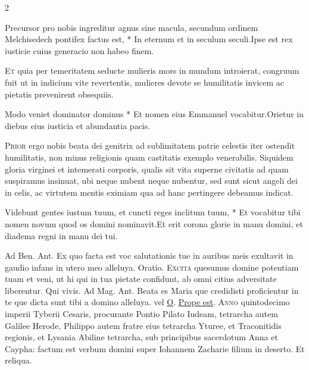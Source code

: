 \begin{multicols*}{2}
\begin{responsory}
{Precursor pro nobis ingreditur agnus sine macula, secundum ordinem Melchisedech pontifex factus est, * In eternum et in seculum seculi.}{Ipse est rex iusticie cuius generacio non habeo finem.}
\end{responsory}%
\lettrine[lines=2]{\zallmancaps \color{Blue} E}{t} quia per temeritatem seducte mulieris mors in mundum introierat, congruum fuit ut in indicium vite revertentis, mulieres devote se humilitatis invicem ac pietatis prevenirent obsequiis.
\begin{responsory}
{Modo veniet dominator dominus * Et nomen eius Emmanuel vocabitur.}{Orietur in diebus eius iusticia et abundantia pacis.}
\end{responsory}%
\lettrine[lines=2]{\zallmancaps \color{Red} P}{rior} ergo nobis beata dei genitrix ad sublimitatem patrie celestis iter ostendit humilitatis, non minus religionis quam castitatis exemplo venerabilis. Siquidem gloria virginei et intemerati corporis, qualis sit vita superne civitatis ad quam suspiramus insinuat, ubi neque nubent neque nubentur, sed sunt sicut angeli dei in celis, ac virtutem mentis eximiam qua ad hanc pertingere debeamus indicat.
\begin{responsory-doxology}
{Videbunt gentes iustum tuum, et cuncti reges inclitum tuum, * Et vocabitur tibi nomen novum quod os domini nominavit.}{Et erit corona glorie in manu domini, et diadema regni in manu dei tui.}
\end{responsory-doxology}%
{\color{Red} Ad Ben. Ant.} Ex quo facta est voc salutationis tue in auribus meis exultavit in gaudio infans in utero meo alleluya. {\color{Red} Oratio.}
\lettrine[lines=2]{\zallmancaps \color{Blue} E}{xcita} quesumus domine potentiam tuam et veni, ut hi qui in tua pietate confidunt, ab omni citius adversitate liberentur. Qui vivis. {\color{Red} Ad Mag. Ant.} Beata es Maria que credidisti proficientur in te que dicta sunt tibi a domino alleluya. {\color{Red} vel} \hyperlink{o-antiphons}{O}.
 \hyperlink{prope-est-iam-invitatorium}{Prope est}.
\lettrine[lines=2]{\zallmancaps \color{Red} A}{nno} quintodecimo imperii Tyberii Cesaris, procurante Pontio Pilato Iudeam, tetrarcha autem Galilee Herode, Philippo autem fratre eius tetrarcha Yturee, et Traconitidis regionis, et Lysania Abiline tetrarcha, sub principibus sacerdotum Anna et Caypha: factum est verbum domini super Iohannem Zacharie filium in deserto. Et reliqua.

\end{multicols*}
